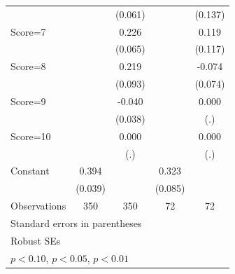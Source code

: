\begin{table}[htbp]
\begin{tabular}{l*{4}{c}}
                &                  &  (0.061)         &                  &  (0.137)         \\
Score=7         &                  &    0.226\sym{***}&                  &    0.119         \\
                &                  &  (0.065)         &                  &  (0.117)         \\
Score=8         &                  &    0.219\sym{**} &                  &   -0.074         \\
                &                  &  (0.093)         &                  &  (0.074)         \\
Score=9         &                  &   -0.040         &                  &    0.000         \\
                &                  &  (0.038)         &                  &      (.)         \\
Score=10        &                  &    0.000         &                  &    0.000         \\
                &                  &      (.)         &                  &      (.)         \\
Constant        &    0.394\sym{***}&                  &    0.323\sym{***}&                  \\
                &  (0.039)         &                  &  (0.085)         &                  \\
\hline
Observations    &      350         &      350         &       72         &       72         \\
\hline\hline
\multicolumn{5}{l}{\footnotesize Standard errors in parentheses}\\
\multicolumn{5}{l}{\footnotesize Robust SEs}\\
\multicolumn{5}{l}{\footnotesize \sym{*} \(p<0.10\), \sym{**} \(p<0.05\), \sym{***} \(p<0.01\)}\\
\end{tabular}
\end{table}
